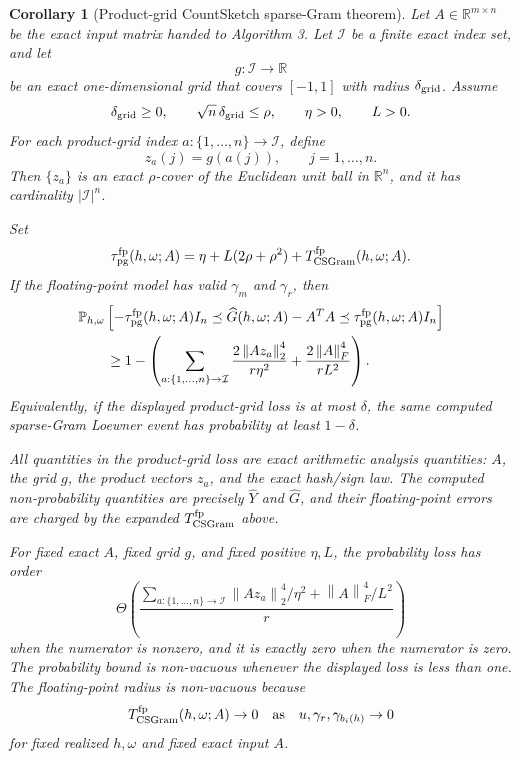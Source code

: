 \documentclass[11pt]{article}
\newcommand{\R}{\mathbb{R}}
\newcommand{\Prob}{\mathbb{P}}
\newcommand{\Frob}[1]{\left\lVert #1\right\rVert_F}
\newcommand{\Norm}[1]{\left\lVert #1\right\rVert_2}
\newcommand{\I}{I}
\newtheorem{corollary}[theorem]{Corollary}
\theoremstyle{remark}
\begin{document}
\begin{corollary}[Product-grid CountSketch sparse-Gram theorem]
Let \(A\in\R^{m\times n}\) be the exact input matrix handed to Algorithm 3.
Let \(\mathcal I\) be a finite exact index set, and let
\[
  g:\mathcal I\to\R
\]
be an exact one-dimensional grid that covers \([-1,1]\) with radius
\(\delta_{\rm grid}\).  Assume
\[
  \delta_{\rm grid}\ge0,
  \qquad
  \sqrt n\,\delta_{\rm grid}\le\rho,
  \qquad
  \eta>0,
  \qquad
  L>0.
\]
For each product-grid index \(a:\{1,\ldots,n\}\to\mathcal I\), define
\[
  z_a(j)=g(a(j)),\qquad j=1,\ldots,n .
\]
Then \(\{z_a\}\) is an exact \(\rho\)-cover of the Euclidean unit ball in
\(\R^n\), and it has cardinality \(|\mathcal I|^n\).

Set
\[
  \tau_{\rm pg}^{\rm fp}(h,\omega;A)
  =
  \eta+L(2\rho+\rho^2)+T_{\rm CSGram}^{\rm fp}(h,\omega;A).
\]
If the floating-point model has valid \(\gamma_m\) and \(\gamma_r\), then
\[
\begin{aligned}
&\Prob_{h,\omega}
  \left[
    -\tau_{\rm pg}^{\rm fp}(h,\omega;A)\I_n
    \preceq
    \widehat G(h,\omega;A)-A^TA
    \preceq
    \tau_{\rm pg}^{\rm fp}(h,\omega;A)\I_n
  \right]
\\
&\qquad\ge
  1-
  \left(
    \sum_{a:\{1,\ldots,n\}\to\mathcal I}
      \frac{2\Norm{Az_a}^4}{r\eta^2}
    +
      \frac{2\Frob{A}^4}{rL^2}
  \right).
\end{aligned}
\]
Equivalently, if the displayed product-grid loss is at most \(\delta\), the
same computed sparse-Gram Loewner event has probability at least
\(1-\delta\).

All quantities in the product-grid loss are exact arithmetic analysis
quantities: \(A\), the grid \(g\), the product vectors \(z_a\), and the exact
hash/sign law.  The computed non-probability quantities are precisely
\(\widehat Y\) and \(\widehat G\), and their floating-point errors are charged
by the expanded \(T_{\rm CSGram}^{\rm fp}\) above.

For fixed exact \(A\), fixed grid \(g\), and fixed positive \(\eta,L\), the
probability loss has order
\[
  \Theta\!\left(
    \frac{
      \sum_{a:\{1,\ldots,n\}\to\mathcal I}\Norm{Az_a}^4/\eta^2
      +
      \Frob{A}^4/L^2
    }{r}
  \right)
\]
when the numerator is nonzero, and it is exactly zero when the numerator is
zero.  The probability bound is non-vacuous whenever the displayed loss is
less than one.  The floating-point radius is non-vacuous because
\[
  T_{\rm CSGram}^{\rm fp}(h,\omega;A)\to0
  \quad\text{as}\quad
  u,\gamma_r,\gamma_{b_i(h)}\to0
\]
for fixed realized \(h,\omega\) and fixed exact input \(A\).
\end{corollary}
\end{document}
